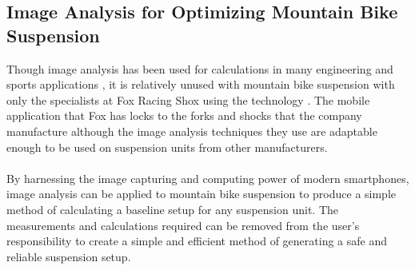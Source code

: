 \subsection{Image Analysis for Optimizing Mountain Bike Suspension}
	Though image analysis has been used for calculations in many engineering and sports applications \citep{concreteanalysis, bridgecables}, it is relatively unused with mountain bike suspension with only the specialists at Fox Racing Shox using the technology \citep{foxird}. The mobile application that Fox has locks to the forks and shocks that the company manufacture although the image analysis techniques they use are adaptable enough to be used on suspension units from other manufacturers. 
	\\\\
	By harnessing the image capturing and computing power of modern smartphones, image analysis can be applied to mountain bike suspension to produce a simple method of calculating a baseline setup for any suspension unit. The measurements and calculations required can be removed from the user’s responsibility to create a simple and efficient method of generating a safe and reliable suspension setup.